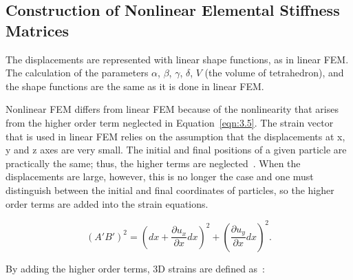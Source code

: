 \subsection{Construction of Nonlinear Elemental Stiffness Matrices}

The displacements are represented with linear shape functions, as in linear FEM. The calculation of the parameters $\alpha$, $\beta$, $\gamma$, $\delta$, $V$ (the volume of tetrahedron), and the shape functions are the same as it is done in linear FEM.

Nonlinear FEM differs from linear FEM because of the nonlinearity that arises from the higher order term neglected in Equation~\ref{eqn:3.5}. The strain vector that is used in linear FEM relies on the assumption that the displacements at x, y and z axes are very small. The initial and final positions of a given particle are practically the same; thus, the higher terms are neglected~\cite{BonetWood97}. When the displacements are large, however, this is no longer the case and one must distinguish between the initial and final coordinates of particles, so the higher order terms are added into the strain equations.

\begin{equation}
 (A'B')^2  = {\left(dx +  \frac{\partial{u_{x}}}{\partial{x}}dx \right)}^2 + {\left(\frac{\partial{u_{y}}}{\partial{x}}dx\right)}^2.
\label{eqn:4.1}
\end{equation}

\noindent By adding the higher order terms, 3D strains are defined as~\cite{Felippa96}:

